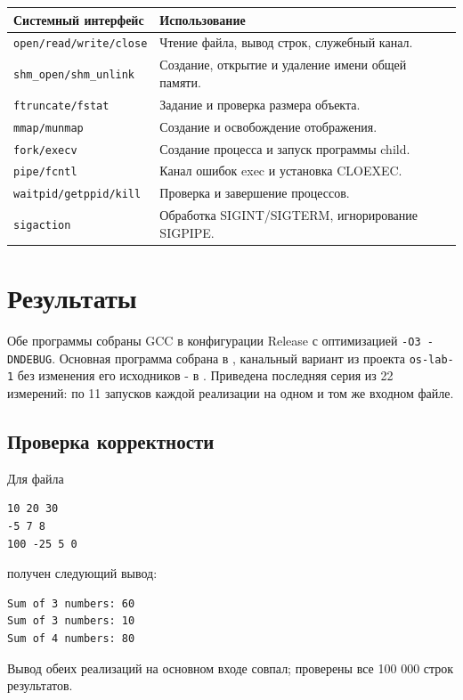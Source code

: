 \documentclass[12pt,a4paper,oneside,fleqn]{article}
\begin{document}
\begin{center}\small
\begin{tabularx}{\textwidth}{lX}
\toprule Системный интерфейс & Использование\\\midrule
\texttt{open/read/write/close} & Чтение файла, вывод строк, служебный канал.\\
\texttt{shm\_open/shm\_unlink} & Создание, открытие и удаление имени общей памяти.\\
\texttt{ftruncate/fstat} & Задание и проверка размера объекта.\\
\texttt{mmap/munmap} & Создание и освобождение отображения.\\
\texttt{fork/execv} & Создание процесса и запуск программы child.\\
\texttt{pipe/fcntl} & Канал ошибок exec и установка CLOEXEC.\\
\texttt{waitpid/getppid/kill} & Проверка и завершение процессов.\\
\texttt{sigaction} & Обработка SIGINT/SIGTERM, игнорирование SIGPIPE.\\\bottomrule
\end{tabularx}\end{center}

\section{Результаты}
Обе программы собраны GCC в конфигурации Release с оптимизацией
\texttt{-O3 -DNDEBUG}. Основная программа собрана в ,
канальный вариант из проекта \texttt{os-lab-1} без изменения его исходников -
в . Приведена последняя серия из 22 измерений:
по 11 запусков каждой реализации на одном и том же входном файле.

\subsection*{Проверка корректности}
Для файла 
\begin{lstlisting}[language={},numbers=none]
10 20 30
-5 7 8
100 -25 5 0
\end{lstlisting}
получен следующий вывод:
\begin{lstlisting}[language={},numbers=none]
Sum of 3 numbers: 60
Sum of 3 numbers: 10
Sum of 4 numbers: 80
\end{lstlisting}
Вывод обеих реализаций на основном входе совпал; проверены все
100 000 строк результатов.
\end{document}
